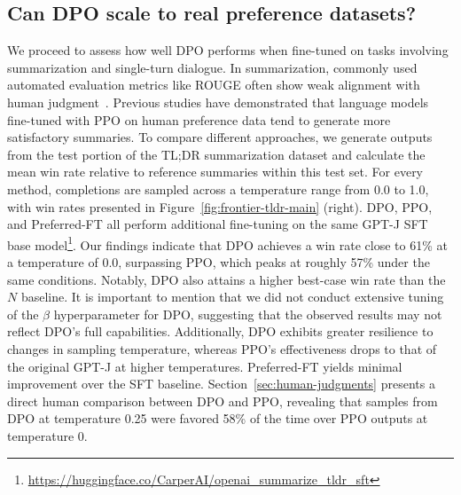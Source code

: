 \subsection{Can DPO scale to real preference datasets?}
\label{sec:dpo-real-datasets}
We proceed to assess how well DPO performs when fine-tuned on tasks involving summarization and single-turn dialogue. In summarization, commonly used automated evaluation metrics like ROUGE often show weak alignment with human judgment~\citep{stiennon2022learning}. Previous studies have demonstrated that language models fine-tuned with PPO on human preference data tend to generate more satisfactory summaries. To compare different approaches, we generate outputs from the test portion of the TL;DR summarization dataset and calculate the mean win rate relative to reference summaries within this test set. For every method, completions are sampled across a temperature range from 0.0 to 1.0, with win rates presented in Figure~\ref{fig:frontier-tldr-main} (right). DPO, PPO, and Preferred-FT all perform additional fine-tuning on the same GPT-J SFT base model\footnote{\url{https://huggingface.co/CarperAI/openai_summarize_tldr_sft}}. Our findings indicate that DPO achieves a win rate close to 61\% at a temperature of 0.0, surpassing PPO, which peaks at roughly 57\% under the same conditions. Notably, DPO also attains a higher best-case win rate than the $N$ baseline. It is important to mention that we did not conduct extensive tuning of the $\beta$ hyperparameter for DPO, suggesting that the observed results may not reflect DPO's full capabilities. Additionally, DPO exhibits greater resilience to changes in sampling temperature, whereas PPO's effectiveness drops to that of the original GPT-J at higher temperatures. Preferred-FT yields minimal improvement over the SFT baseline. Section~\ref{sec:human-judgments} presents a direct human comparison between DPO and PPO, revealing that samples from DPO at temperature 0.25 were favored 58\% of the time over PPO outputs at temperature 0.

